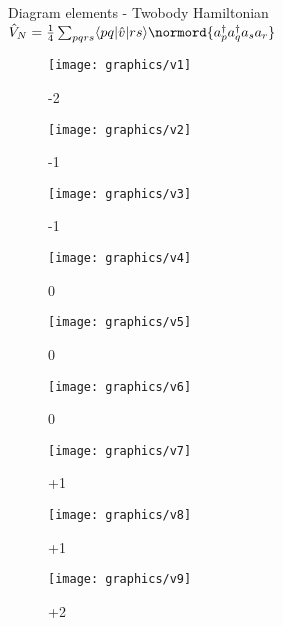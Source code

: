 \documentclass[compress]{beamer}
\newcommand*{\ket}[1]{|#1\rangle}
\newcommand*{\bra}[1]{\langle#1|}
\begin{document}
\begin{frame}{Diagram elements - Twobody Hamiltonian $\hat{V}_N=\frac{1}{4} \sum_{pqrs} \bra{pq}\hat{v}\ket{rs} \normord{a^\dagger_p a^\dagger_q a_s  a_r}$}
    \renewcommand{\figurename}{Level}

    \begin{figure}
    \centering
    \parbox{0.30\textwidth}{
            \centering
            \texttt{[image: graphics/v1]}
            \caption{-2}
        }\quad
        \parbox{0.30\textwidth}{
            \centering
            \texttt{[image: graphics/v2]}
            \caption{-1}
        }\quad
        \parbox{0.30\textwidth}{
            \centering
            \texttt{[image: graphics/v3]}
            \caption{-1}
        }
    \end{figure}

    \begin{figure}
    \centering
    \parbox{0.30\textwidth}{
            \centering
            \texttt{[image: graphics/v4]}
            \caption{0}
        }\quad
        \parbox{0.30\textwidth}{
            \centering
            \texttt{[image: graphics/v5]}
            \caption{0}
        }\quad
        \parbox{0.30\textwidth}{
            \centering
            \texttt{[image: graphics/v6]}
            \caption{0}
        }
    \end{figure}

    \begin{figure}
    \centering
    \parbox{0.30\textwidth}{
            \centering
            \texttt{[image: graphics/v7]}
            \caption{+1}
        }\quad
        \parbox{0.30\textwidth}{
            \centering
            \texttt{[image: graphics/v8]}
            \caption{+1}
        }\quad
        \parbox{0.30\textwidth}{
            \centering
            \texttt{[image: graphics/v9]}
            \caption{+2}
        }
    \end{figure}

\end{frame}
\end{document}
